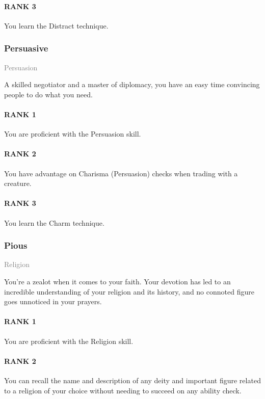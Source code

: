 \paragraph{RANK 3} You learn the Distract technique.

\subsubsection{Persuasive} \label{feat::persuasive}
\small{\textcolor{gray}{Persuasion}}

\normalsize
A skilled negotiator and a master of diplomacy, you have an easy time convincing people to do what you need.
\paragraph{RANK 1} You are proficient with the Persuasion skill.
\paragraph{RANK 2} You have advantage on Charisma (Persuasion) checks when trading with a creature.
\paragraph{RANK 3} You learn the Charm technique.

\subsubsection{Pious} \label{feat::pious}
\small{\textcolor{gray}{Religion}}

\normalsize
You're a zealot when it comes to your faith.
Your devotion has led to an incredible understanding of your religion and its history, and no connoted figure goes unnoticed in your prayers.
\paragraph{RANK 1} You are proficient with the Religion skill.
\paragraph{RANK 2} You can recall the name and description of any deity and important figure related to a religion of your choice without needing to succeed on any ability check.
